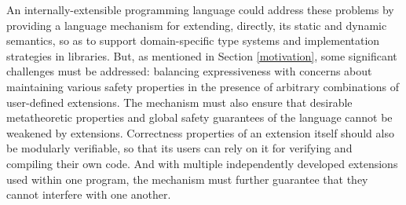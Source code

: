 %
%



An internally-extensible programming language could address these problems by providing a language mechanism for extending, directly, its static and dynamic semantics, so as to support domain-specific type systems and implementation strategies in libraries. 
But, as mentioned in Section \ref{motivation}, some significant challenges must be addressed: balancing  expressiveness with concerns about maintaining various safety properties in the presence of arbitrary combinations of user-defined  extensions. The mechanism must also ensure that desirable metatheoretic properties and global safety guarantees of the language cannot be weakened by extensions. Correctness properties of an extension itself should also be modularly verifiable, so that its users can rely on it for verifying and compiling their own code.  And with multiple independently developed extensions used within one program, the mechanism must further guarantee that they cannot interfere with one another. 

\newpage
